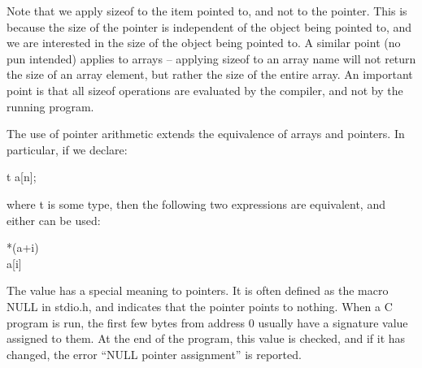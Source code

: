      Note that  we apply  {\cd sizeof} to  the item pointed to, and
not to the pointer.  This is  because the  size of  the pointer  is
independent of the object being pointed to, and we are interested in 
the size of the object being pointed to. A similar point (no pun
intended) applies to
arrays -- applying {\cd sizeof} to an array name will not return the
size of an array element, but  rather the size of the entire  array.
An important point is that all  {\cd sizeof} operations are evaluated
by  the compiler, and  not  by  the running program.

   The use  of pointer  arithmetic extends the equivalence  of arrays  and
pointers. In particular, if we declare:
\begin{code}
t    a[n];
\end{code}
\noindent
     where {\cd t} is some type, then the following two expressions are equivalent, and either can
be used:  
\begin{code} 
*(a+i)    \\ 
a[i] 
\end{code} 
\noindent
     The value {} has a special meaning to pointers. It is often
defined as the macro {\cd NULL} in 
{\fn stdio.h}, and indicates that
the pointer points to nothing.  When a C program is run, the first
few bytes from address 0 usually have a signature value assigned to
them. At the end of the program, this value is checked, and if it has
changed, the error ``NULL pointer assignment'' is reported.

